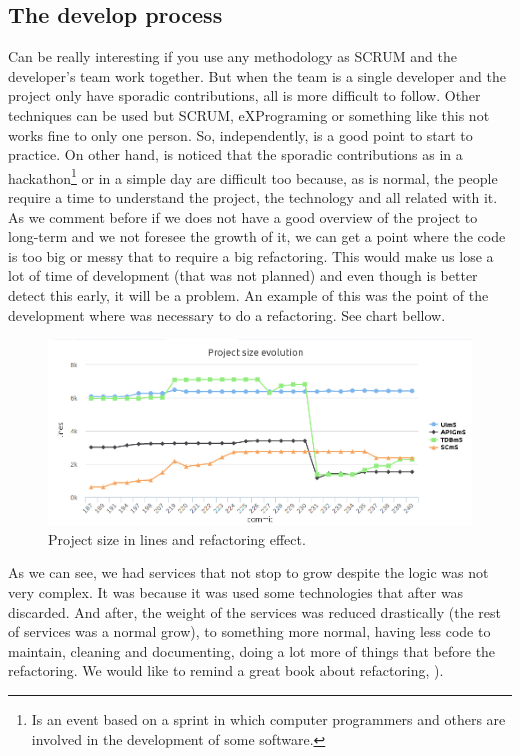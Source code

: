 \subsection{The develop process}

Can be really interesting if you use any methodology as SCRUM and the developer's
team work together. But when the team is a single developer and the project only
have sporadic contributions,
all is more difficult to follow. Other techniques can be used but SCRUM, eXPrograming
or something like this not works fine to only one person.
\intro
So, independently, is a good point to start to practice. On other hand, is
noticed that the sporadic contributions as in a hackathon\footnote{Is an event based on a sprint
in which computer programmers and others are involved in the development of some software.} or
in a simple day are difficult too because, as is normal, the people require a time to understand the
project, the technology and all related with it.
\intro
As we comment before if we does not have a good overview of the project to long-term
and we not foresee the growth of it, we can get a point where the code is too big
or messy that to require a big refactoring.
This would make us lose a lot of time of development (that was not planned) and
even though is better detect this early, it will be a problem.
An example of this was the point of the development where was necessary to do a
refactoring. See chart bellow.

\begin{figure}[H]
  \includegraphics[scale=0.45]{img/graphics/repository_size.png}
  \centering
  \caption{Project size in lines and refactoring effect.}
\end{figure}

\noindent As we can see, we had services that not stop to grow despite the logic
was not very complex. It was because it was used some technologies that after was
discarded. And after, the weight of the services was reduced drastically (the rest
of services was a normal grow), to something more normal, having less code to
maintain, cleaning and documenting, doing a lot more of things that before the
refactoring. We would like to remind a great book about refactoring, \cite{refactor}).


